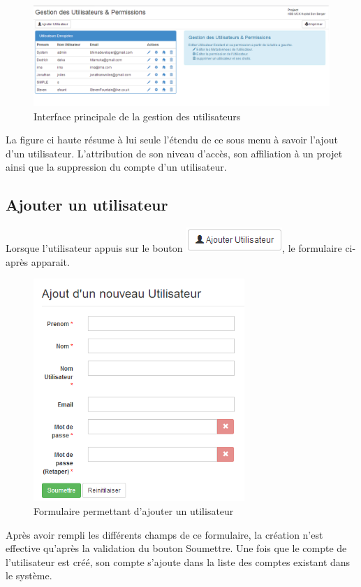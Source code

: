 \documentclass[12pt,a4paper]{report}
\begin{document}
\begin{figure}[h]
\begin{center}
\includegraphics[width=14cm]{pic/userAllow.png}
\end{center}
\caption{Interface principale de la gestion des utilisateurs}
\label{Interface principale de la gestion des utilisateurs}
\end{figure} 
La figure ci haute résume à lui seule l'étendu de ce sous menu à savoir l'ajout d'un utilisateur. L'attribution de son niveau d'accès, son affiliation à un projet ainsi que la suppression du compte d'un utilisateur.

\subsection{Ajouter un utilisateur}
Lorsque l'utilisateur appuis sur le bouton \includegraphics[scale=1]{pic/AddUser.png}, le formulaire ci-après apparait.
\begin{figure}[h]
\begin{center}
\includegraphics[width=8cm]{pic/FormAddUser.png}
\end{center}
\caption{Formulaire permettant d'ajouter un utilisateur}
\label{Formulaire permettant d'ajouter un utilisateur}
\end{figure}
\newpage
Après avoir rempli les différents champs de ce formulaire, la création n'est effective qu'après la validation du bouton Soumettre.
Une fois que le compte de l'utilisateur est créé, son compte s'ajoute dans la liste des comptes existant dans le système.
\end{document}
